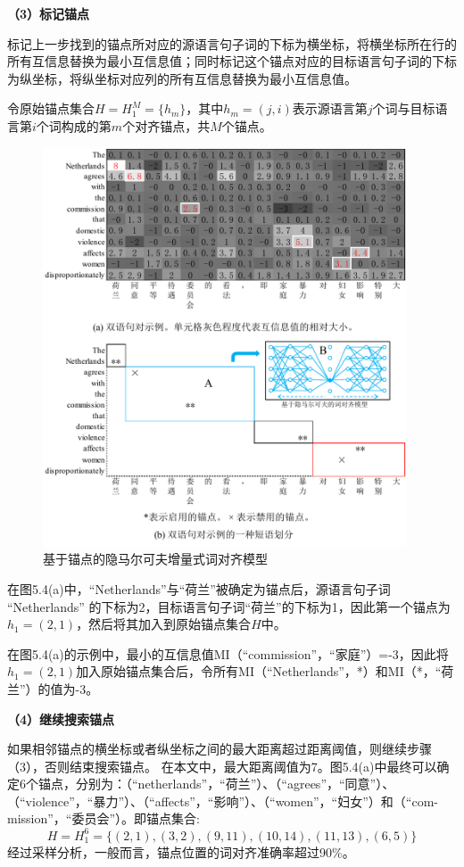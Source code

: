 \textbf{（3）标记锚点}

标记上一步找到的锚点所对应的源语言句子词的下标为横坐标，将横坐标所在行的所有互信息替换为最小互信息值；同时标记这个锚点对应的目标语言句子词的下标为纵坐标，将纵坐标对应列的所有互信息替换为最小互信息值。

令原始锚点集合$H=H_1^M=\{h_m\}$，其中$h_m=(j,i)$表示源语言第$j$个词与目标语言第$i$个词构成的第$m$个对齐锚点，共$M$个锚点。

\begin{figure}[!hbt]
	\centering
	\includegraphics[width=0.96\textwidth]{Figure/Figure_5_4.pdf}
	\caption{基于锚点的隐马尔可夫增量式词对齐模型}
	\label{Fig_anchor_hmm}
\end{figure}

在图5.4(a)中，“Netherlands”与“荷兰”被确定为锚点后，源语言句子词
``Netherlands'' 的下标为2，目标语言句子词“荷兰”的下标为1，因此第一个锚点为$h_1=(2,1)$，然后将其加入到原始锚点集合$H$中。

在图5.4(a)的示例中，最小的互信息值MI（“commission”，“家庭”）=-3，因此将$h_1=(2,1)$加入原始锚点集合后，令所有MI（“Netherlands”，*）和MI（*，“荷兰”）的值为-3。

\textbf{（4）继续搜索锚点}

如果相邻锚点的横坐标或者纵坐标之间的最大距离超过距离阈值，则继续步骤（3），否则结束搜索锚点。
在本文中，最大距离阈值为7。图5.4(a)中最终可以确定6个锚点，分别为：（“netherlands”，“荷兰”）、（“agrees”，“同意”）、\linebreak
（“violence”，“暴力”）、（“affects”，“影响”）、（“women”，“妇女”）和（“com-mission”，“委员会”）。即锚点集合:
$$H=H_1^6=\{(2,1),(3,2),(9,11),(10,14),(11,13),(6,5)\}$$
经过采样分析，一般而言，锚点位置的词对齐准确率超过90\%。

